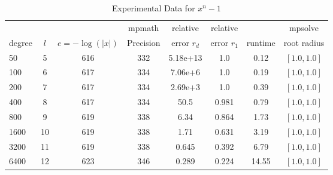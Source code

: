 \documentclass[sigconf]{acmart}
\begin{document}
\begin{table}[t]
\caption{Experimental Data for $x^n - 1$}
\label{tab:nroots}
\vskip -0.15in
\begin{center}
\begin{small}
\begin{sc}
\begin{tabular}{lccccccc}
\toprule
&  &  & mpmath & relative  & relative &  & mpsolve \\
degree  & $l$& $e=-\log(|x|)$& Precision &error $r_d$       & error $r_1$ &runtime& root radius\\
\midrule

 50 & 5 & 616 & 332 & 5.18e+13 & 1.0 & 0.12 & $[1.0, 1.0]$\\
 100 & 6 & 617 & 334 & 7.06e+6 & 1.0 & 0.19 & $[1.0, 1.0]$\\
 200 & 7 & 617 & 334 & 2.69e+3 & 1.0 & 0.39 & $[1.0, 1.0]$\\
 400 & 8 & 617 & 334 & 50.5 & 0.981 & 0.79 & $[1.0, 1.0]$\\
 800 & 9 & 619 & 338 & 6.34 & 0.864 & 1.73 & $[1.0, 1.0]$\\
 1600 & 10 & 619 & 338 & 1.71 & 0.631 & 3.19 & $[1.0, 1.0]$\\
 3200 & 11 & 619 & 338 & 0.645 & 0.392 & 6.79 & $[1.0, 1.0]$\\
 6400 & 12 & 623 & 346 & 0.289 & 0.224 & 14.55 & $[1.0, 1.0]$\\
\bottomrule
\end{tabular}
\end{sc}
\end{small}
\end{center}
\vskip 0.05in
\end{table}
\end{document}
